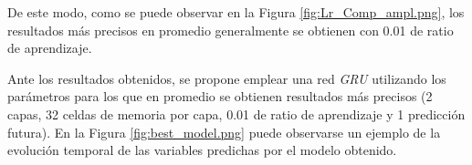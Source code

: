 De este modo, como se puede observar en la Figura \ref{fig:Lr_Comp_ampl.png}, los resultados más precisos
en promedio generalmente se obtienen con 0.01 de ratio de aprendizaje.

\newpage

Ante los resultados obtenidos, se propone emplear una red \textit{GRU} utilizando los parámetros
para los que en promedio se obtienen resultados más precisos (2 capas, 32 celdas de memoria por 
capa, 0.01 de ratio de aprendizaje y 1 predicción futura). En la Figura 
\ref{fig:best_model.png} puede observarse un ejemplo de la evolución temporal de las variables 
predichas por el modelo obtenido.


